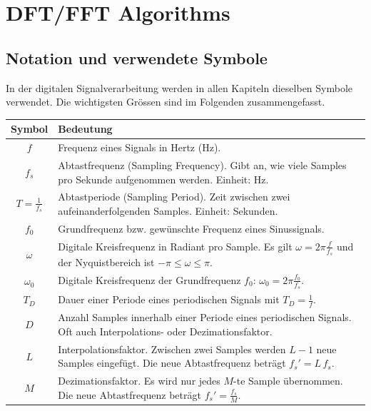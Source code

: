\section{DFT/FFT Algorithms}

\subsection{Notation und verwendete Symbole}

In der digitalen Signalverarbeitung werden in allen Kapiteln dieselben
Symbole verwendet. Die wichtigsten Grössen sind im Folgenden
zusammengefasst.

\begin{center}
	\renewcommand{\arraystretch}{1.2}
	\small
	\begin{tabularx}{\columnwidth}{|c|X|}
		\hline
		\textbf{Symbol} & \textbf{Bedeutung} \\ \hline
		$f$ & Frequenz eines Signals in Hertz (Hz). \\ \hline
		$f_s$ & Abtastfrequenz (Sampling Frequency). Gibt an, wie viele Samples pro Sekunde aufgenommen werden. Einheit: Hz. \\ \hline
		$T=\frac{1}{f_s}$ & Abtastperiode (Sampling Period). Zeit zwischen zwei aufeinanderfolgenden Samples. Einheit: Sekunden. \\ \hline
		$f_0$ & Grundfrequenz bzw. gewünschte Frequenz eines Sinussignals. \\ \hline
		$\omega$ & Digitale Kreisfrequenz in Radiant pro Sample. Es gilt $\omega = 2\pi\frac{f}{f_s}$ und der Nyquistbereich ist $-\pi \le \omega \le \pi$. \\ \hline
		$\omega_0$ & Digitale Kreisfrequenz der Grundfrequenz $f_0$: $\omega_0=2\pi\frac{f_0}{f_s}$. \\ \hline
		$T_D$ & Dauer einer Periode eines periodischen Signals mit $T_D=\frac{1}{f}$. \\ \hline
		$D$ & Anzahl Samples innerhalb einer Periode eines periodischen Signals. Oft auch Interpolations- oder Dezimationsfaktor. \\ \hline
		$L$ & Interpolationsfaktor. Zwischen zwei Samples werden $L-1$ neue Samples eingefügt. Die neue Abtastfrequenz beträgt $f_s'=L\,f_s$. \\ \hline
		$M$ & Dezimationsfaktor. Es wird nur jedes $M$-te Sample übernommen. Die neue Abtastfrequenz beträgt $f_s'=\frac{f_s}{M}$. \\ \hline
	\end{tabularx}
\end{center}

